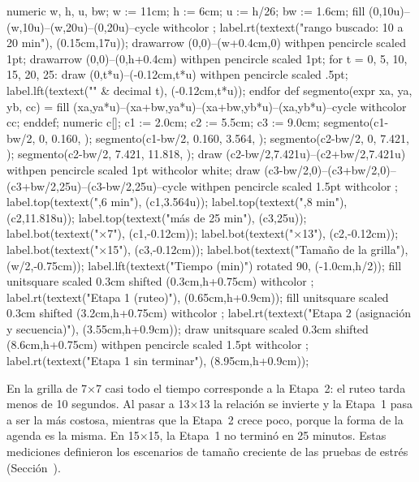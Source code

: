 {\startMPcode
numeric w, h, u, bw; w := 11cm; h := 6cm; u := h/26; bw := 1.6cm;
fill (0,10u)--(w,10u)--(w,20u)--(0,20u)--cycle withcolor ;
label.rt(textext("\tfx rango buscado: 10 a 20 min"), (0.15cm,17u));
drawarrow (0,0)--(w+0.4cm,0) withpen pencircle scaled 1pt;
drawarrow (0,0)--(0,h+0.4cm) withpen pencircle scaled 1pt;
for t = 0, 5, 10, 15, 20, 25:
  draw (0,t*u)--(-0.12cm,t*u) withpen pencircle scaled .5pt;
  label.lft(textext("\tfx " & decimal t), (-0.12cm,t*u));
endfor
def segmento(expr xa, ya, yb, cc) =
  fill (xa,ya*u)--(xa+bw,ya*u)--(xa+bw,yb*u)--(xa,yb*u)--cycle withcolor cc;
enddef;
numeric c[]; c1 := 2.0cm; c2 := 5.5cm; c3 := 9.0cm;
segmento(c1-bw/2, 0, 0.160, );
segmento(c1-bw/2, 0.160, 3.564, );
segmento(c2-bw/2, 0, 7.421, );
segmento(c2-bw/2, 7.421, 11.818, );
draw (c2-bw/2,7.421u)--(c2+bw/2,7.421u) withpen pencircle scaled 1pt withcolor white;
draw (c3-bw/2,0)--(c3+bw/2,0)--(c3+bw/2,25u)--(c3-bw/2,25u)--cycle withpen pencircle scaled 1.5pt withcolor ;
label.top(textext(",6 min"), (c1,3.564u));
label.top(textext(",8 min"), (c2,11.818u));
label.top(textext("\tfx más de 25 min"), (c3,25u));
label.bot(textext("×7"), (c1,-0.12cm));
label.bot(textext("×13"), (c2,-0.12cm));
label.bot(textext("×15"), (c3,-0.12cm));
label.bot(textext("Tamaño de la grilla"), (w/2,-0.75cm));
label.lft(textext("Tiempo (min)") rotated 90, (-1.0cm,h/2));
fill unitsquare scaled 0.3cm shifted (0.3cm,h+0.75cm) withcolor ;
label.rt(textext("\tfx Etapa 1 (ruteo)"), (0.65cm,h+0.9cm));
fill unitsquare scaled 0.3cm shifted (3.2cm,h+0.75cm) withcolor ;
label.rt(textext("\tfx Etapa 2 (asignación y secuencia)"), (3.55cm,h+0.9cm));
draw unitsquare scaled 0.3cm shifted (8.6cm,h+0.75cm) withpen pencircle scaled 1.5pt withcolor ;
label.rt(textext("\tfx Etapa 1 sin terminar"), (8.95cm,h+0.9cm));
\stopMPcode}

En la grilla de 7×7 casi todo el tiempo corresponde a la Etapa~2: el ruteo
tarda menos de 10 segundos. Al pasar a 13×13 la relación se invierte y la
Etapa~1 pasa a ser la más costosa, mientras que la Etapa~2 crece poco,
porque la forma de la agenda es la misma. En 15×15, la Etapa~1 no terminó
en 25 minutos. Estas mediciones definieron los escenarios de tamaño
creciente de las pruebas de estrés (Sección~).

